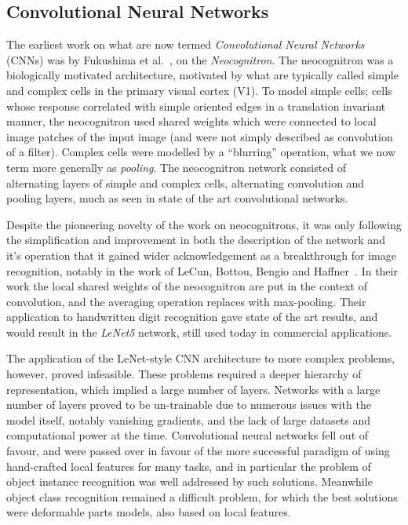 \documentclass[thesis]{subfiles}
\begin{document}
\subsection{Convolutional Neural Networks}
The earliest work on what are now termed \emph{Convolutional Neural Networks} (CNNs) was by Fukushima et al.~\cite{Fuk80,fukushima2013artificial}, on the \emph{Neocognitron}. The neocognitron was a biologically motivated architecture, motivated by what are typically called simple and complex cells in the primary visual cortex (V1). To model simple cells; cells whose response correlated with simple oriented edges in a translation invariant manner, the neocognitron used shared weights which were connected to local image patches of the input image (and were not simply described as convolution of a filter). Complex cells were modelled by a ``blurring'' operation, what we now term more generally as \emph{pooling}. The neocognitron network consisted of alternating layers of simple and complex cells, \ie alternating convolution and pooling layers, much as seen in state of the art convolutional networks.

Despite the pioneering novelty of the work on neocognitrons, it was only following the simplification and improvement in both the description of the network and it's operation that it gained wider acknowledgement as a breakthrough for image recognition, notably in the work of LeCun, Bottou, Bengio and Haffner~\cite{Lecun1998}. In their work the local shared weights of the neocognitron are put in the context of convolution, and the averaging operation replaces with max-pooling. Their application to handwritten digit recognition gave state of the art results, and would result in the \emph{LeNet5} network, still used today in commercial applications. 

The application of the LeNet-style CNN architecture to more complex problems, however, proved infeasible. These problems required a deeper hierarchy of representation, which implied a large number of layers. Networks with a large number of layers proved to be un-trainable due to numerous issues with the model itself, notably vanishing gradients, and the lack of large datasets and computational power at the time. Convolutional neural networks fell out of favour, and were passed over in favour of the more successful paradigm of using hand-crafted local features for many tasks, and in particular the problem of object instance recognition was well addressed by such solutions. Meanwhile object class recognition remained a difficult problem, for which the best solutions were deformable parts models, also based on local features.
\end{document}
